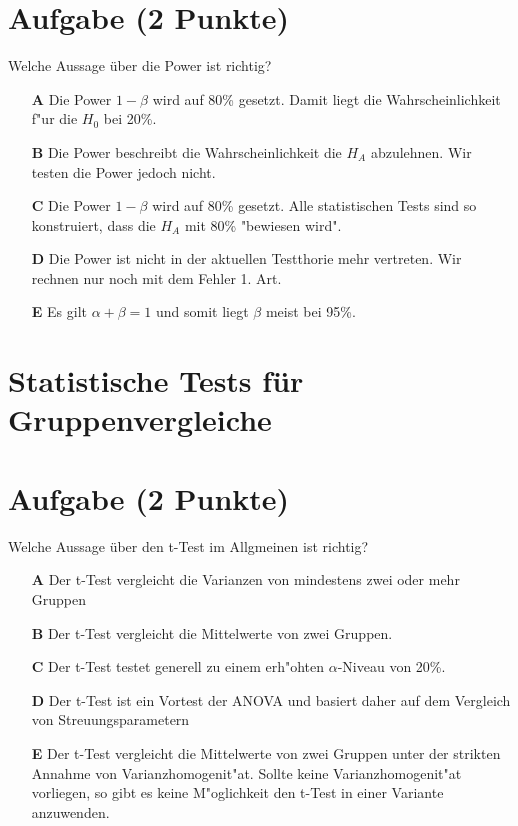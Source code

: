 \documentclass[a4paper, 9pt]{scrartcl}\usepackage[]{graphicx}\usepackage[]{xcolor}
\begin{document}
\section{Aufgabe \hfill (2 Punkte)}

Welche Aussage {\"u}ber die Power ist richtig?



\begin{enumerate}
\item [\textbf{A} \msquare] Die Power $1-\beta$ wird auf 80\% gesetzt. Damit liegt die Wahrscheinlichkeit f{"u}r die $H_0$ bei 20\%.
\item [\textbf{B} \msquare] Die Power beschreibt die Wahrscheinlichkeit die $H_A$ abzulehnen. Wir testen die Power jedoch nicht.
\item [\textbf{C} \msquare] Die Power $1-\beta$ wird auf 80\% gesetzt. Alle statistischen Tests sind so konstruiert, dass die $H_A$ mit 80\% "bewiesen wird".
\item [\textbf{D} \msquare] Die Power ist nicht in der aktuellen Testthorie mehr vertreten. Wir rechnen nur noch mit dem Fehler 1. Art.
\item [\textbf{E} \msquare] Es gilt $\alpha + \beta = 1$ und somit liegt $\beta$ meist bei 95\%.
\end{enumerate}
\section*{Statistische Tests für Gruppenvergleiche} 

\section{Aufgabe \hfill (2 Punkte)}

Welche Aussage {\"u}ber den t-Test im Allgmeinen ist richtig? 



\begin{enumerate}
\item [\textbf{A} \msquare] Der t-Test vergleicht die Varianzen von mindestens zwei oder mehr Gruppen
\item [\textbf{B} \msquare] Der t-Test vergleicht die Mittelwerte von zwei Gruppen.
\item [\textbf{C} \msquare] Der t-Test testet generell zu einem erh{"o}hten $\alpha$-Niveau von 20\%.
\item [\textbf{D} \msquare] Der t-Test ist ein Vortest der ANOVA und basiert daher auf dem Vergleich von Streuungsparametern
\item [\textbf{E} \msquare] Der t-Test vergleicht die Mittelwerte von zwei Gruppen unter der strikten Annahme von Varianzhomogenit{"a}t. Sollte keine Varianzhomogenit{"a}t vorliegen, so gibt es keine M{"o}glichkeit den t-Test in einer Variante anzuwenden.
\end{enumerate}
\end{document}
